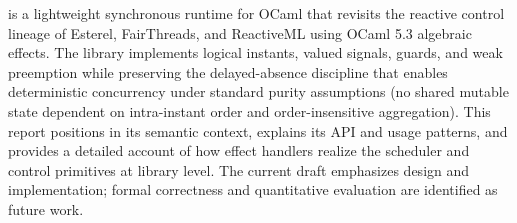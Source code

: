 \tempo{} is a lightweight synchronous runtime for OCaml that revisits the
reactive control lineage of Esterel, FairThreads, and ReactiveML using OCaml
5.3 algebraic effects. The library implements logical instants, valued signals,
guards, and weak preemption while preserving the delayed-absence discipline
that enables deterministic concurrency under standard purity assumptions (no
shared mutable state dependent on intra-instant order and order-insensitive
aggregation). This report positions \tempo{} in its
semantic context, explains its API and usage patterns, and provides a detailed
account of how effect handlers realize the scheduler and control primitives at
library level. The current draft emphasizes design and implementation; formal
correctness and quantitative evaluation are identified as future work.
